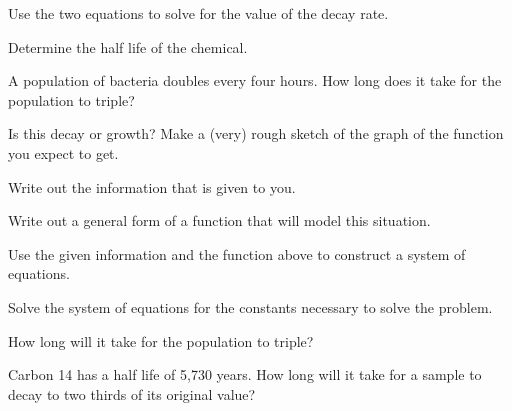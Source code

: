 \begin{problem}
\begin{subproblem}
\begin{subsubproblem}
    \item Use the two equations to solve for the value of the decay rate.
      \vfill
      \vfill

    \item Determine the half life of the chemical.
      \vfill
    \end{subsubproblem}

    
  \end{subproblem}

\clearpage

\item A population of bacteria doubles every four hours. How long does
  it take for the population to triple?
  \begin{subproblem}
  \item Is this decay or growth? Make a (very) rough sketch of the
    graph of the function you expect to get.
    \vfill
  \item Write out the information that is given to you.
    \vfill
  \item Write out a general form of a function that will model this
    situation.
    \vspace{1em}
  \item Use the given information and the function above to construct
    a system of equations.
    \vfill
    \clearpage
  \item Solve the system of equations for the constants necessary to
    solve the problem.
    \vfill
  \item How long will it take for the population to triple?
    \vfill
  \end{subproblem}

\clearpage

\item Carbon 14 has a half life of 5,730 years. How long will it take
  for a sample to decay to two thirds of its original value?
  \vfill
\clearpage



\end{problem}

\postClass

